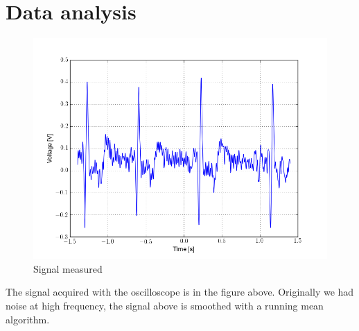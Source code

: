 \section{Data analysis}
\begin{figure}[H]
\centering
\includegraphics[width=.7\textwidth]{8/ecg.png}
\caption{Signal measured}
\end{figure}
The signal acquired with the oscilloscope is in the figure above. Originally we had noise at high frequency, the signal above is smoothed with a running mean algorithm.